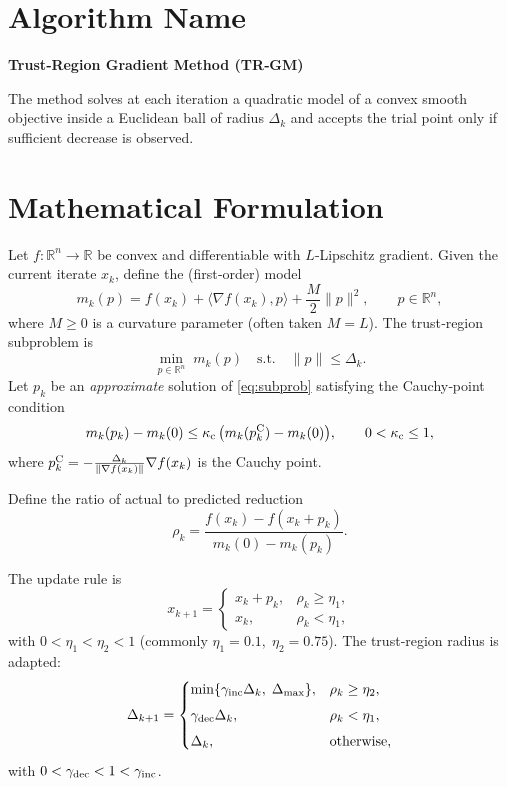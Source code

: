 \documentclass{article}
\newcommand{\R}{\mathbb{R}}
\begin{document}
\section*{Algorithm Name}
\textbf{Trust‑Region Gradient Method (TR‑GM)}  

The method solves at each iteration a quadratic model of a convex smooth objective inside a Euclidean ball of radius $\Delta_k$ and accepts the trial point only if sufficient decrease is observed.

\section*{Mathematical Formulation}
Let $f:\R^n\to\R$ be convex and differentiable with $L$‑Lipschitz gradient.  
Given the current iterate $x_k$, define the (first‑order) model
\[
m_k(p)=f(x_k)+\langle \nabla f(x_k),p\rangle+\frac{M}{2}\|p\|^2,
\qquad p\in\R^n,
\]
where $M\ge 0$ is a curvature parameter (often taken $M=L$).  
The trust‑region subproblem is
\begin{equation}
\label{eq:subprob}
\min_{p\in\R^n}\; m_k(p)\quad\text{s.t.}\quad \|p\| \le \Delta_k .
\end{equation}
Let $p_k$ be an \emph{approximate} solution of \eqref{eq:subprob} satisfying the Cauchy‑point condition
\begin{equation}
\label{eq:cauchy}
m_k(p_k)-m_k(0)\le \kappa_{\rm c}\,\bigl(m_k(p^{\rm C}_k)-m_k(0)\bigr),
\qquad 0<\kappa_{\rm c}\le 1,
\end{equation}
where $p^{\rm C}_k=-\frac{\Delta_k}{\|\nabla f(x_k)\|}\nabla f(x_k)$ is the Cauchy point.

Define the ratio of actual to predicted reduction
\[
\rho_k = \frac{f(x_k)-f(x_k+p_k)}{m_k(0)-m_k(p_k)} .
\]

The update rule is
\[
x_{k+1}= 
\begin{cases}
x_k+p_k, & \rho_k\ge \eta_1,\\[4pt]
x_k,    & \rho_k<\eta_1,
\end{cases}
\]
with $0<\eta_1<\eta_2<1$ (commonly $\eta_1=0.1,\;\eta_2=0.75$).  
The trust‑region radius is adapted:
\[
\Delta_{k+1}= 
\begin{cases}
\min\{\gamma_{\rm inc}\Delta_k,\;\Delta_{\max}\}, & \rho_k\ge \eta_2,\\[4pt]
\gamma_{\rm dec}\Delta_k, & \rho_k<\eta_1,\\[4pt]
\Delta_k, & \text{otherwise},
\end{cases}
\]
with $0<\gamma_{\rm dec}<1<\gamma_{\rm inc}$.
\end{document}
